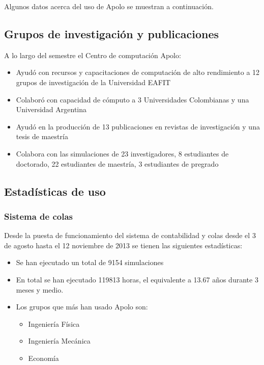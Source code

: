 Algunos datos acerca del uso de Apolo se muestran a continuación.

\subsection{Grupos de investigación y publicaciones}
A lo largo del semestre el Centro de computación Apolo:

\begin{itemize}
\item Ayudó con recursos y capacitaciones de computación de alto rendimiento a 12 grupos de investigación de la Universidad EAFIT
\item Colaboró con capacidad de cómputo a 3 Universidades Colombianas y una Universidad Argentina
\item Ayudó en la producción de 13 publicaciones en revistas de investigación y una tesis de maestría
\item Colabora con las simulaciones de 23 investigadores, 8 estudiantes de doctorado, 22 estudiantes de maestría, 3 estudiantes de pregrado
\end{itemize}

\subsection{Estadísticas de uso}

\subsubsection{Sistema de colas}

Desde la puesta de funcionamiento del sistema de contabilidad y colas desde el 3 de agosto hasta el 12 noviembre de 2013 se tienen las siguientes estadísticas:

\begin{itemize}
\item Se han ejecutado un total de 9154 simulaciones
\item En total se han ejecutado 119813 horas, el equivalente a 13.67 años durante 3 meses y medio.
\item Los grupos que más han usado Apolo son:
  \begin{itemize}
    \item Ingeniería Física
    \item Ingeniería Mecánica
    \item Economía
  \end{itemize}
\end{itemize}


